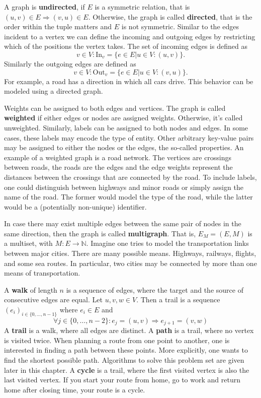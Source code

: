         A graph is \textbf{undirected}, if $E$ is a symmetric relation, that is $(u, v) \in E \Rightarrow (v, u) \in E$. 
        Otherwise, the graph is called \textbf{directed}, that is the order within the tuple matters and $E$ is not symmetric.             
        Similar to the edges incident to a vertex we can define the incoming and outgoing edges by restricting which of the positions the vertex takes. 
        The set of incoming edges is defined as
        \[v \in V: \text{In}_v = \{e \in E |u \in V: (u, v) \}.\]
        Similarly the outgoing edges are defined as 
        \[v \in V: \text{Out}_v = \{e \in E |u \in V: (v, u) \}.
        \]
        For example, a road has a direction in which all cars drive. 
        This behavior can be modeled using a directed graph.
        
        Weights can be assigned to both edges and vertices. The graph is called \textbf{weighted} if either edges or nodes are assigned weights.
        Otherwise, it's called unweighted.
        Similarly, labels can be assigned to both nodes and edges. 
        In some cases, these labels may encode the type of entity.
        Other arbitrary key-value pairs may be assigned to either the nodes or the edges, the so-called properties.           
        An example of a weighted graph is a road network.
        The vertices are crossings between roads, the roads are the edges and the edge weights represent the distances between the crossings that are connected by the road.
        To include labels, one could distinguish between highways and minor roads or simply assign the name of the road. 
        The former would model the type of the road, while the latter would be a (potentially non-unique) identifier.
        
        In case there may exist multiple edges between the same pair of nodes in the same direction, then the graph is called \textbf{multigraph}. 
        That is, $E_M = (E, M)$ is a multiset, with $M: E \rightarrow \mathbb{N}$. 
        Imagine one tries to model the transportation links between major cities. 
        There are many possible means. Highways, railways, flights, and some sea routes. 
        In particular, two cities may be connected by more than one means of transportation.
        
        A \textbf{walk} of length $n$ is a sequence of edges, where the target and the source of consecutive edges are equal. Let $u,v,w \in V$. Then a trail is a sequence $(e_i)_{i \in \{0, \dots, n-1\}}$ where $e_i \in E$ and
        \[ \forall j \in \{0, \dots, n-2\}: e_j = (u, v) \Rightarrow e_{j+1} = (v, w)\] 
        A \textbf{trail} is a walk, where all edges are distinct. 
        A \textbf{path} is a trail, where no vertex is visited twice.
        When planning a route from one point to another, one is interested in finding a path between these points.
        More explicitly, one wants to find the shortest possible path. 
        Algorithms to solve this problem set are given later in this chapter. A \textbf{cycle} is a trail, where the first visited vertex is also the last visited vertex. 
        If you start your route from home, go to work and return home after closing time, your route is a cycle.
        
